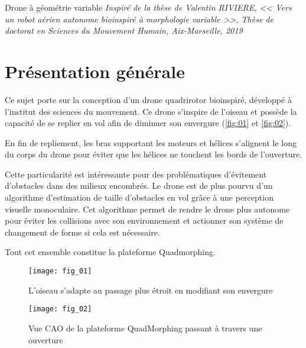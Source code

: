 
Drone à géométrie variable
\textit{Inspiré de la thèse de Valentin RIVIERE,
<< Vers un robot aérien autonome bio­inspiré à morphologie variable >>,
Thèse de doctorat en Sciences du Mouvement Humain, Aix-­Marseille, 2019}

\section*{Présentation générale}


Ce sujet porte sur la conception d’un drone quadrirotor bio­inspiré, développé à l’institut des
sciences du mouvement. Ce drone s’inspire de l’oiseau et possède la capacité de se replier
en vol afin de diminuer son envergure (\autoref{fig:01} et \autoref{fig:02}).

En fin de repliement, les bras supportant les moteurs et hélices s’alignent le long du corps
du drone pour éviter que les hélices ne touchent les bords de l’ouverture.

Cette particularité est intéressante pour des problématiques d’évitement d’obstacles dans
des milieux encombrés. Le drone est de plus pourvu d’un algorithme d’estimation de taille
d’obstacles en vol grâce à une perception visuelle monoculaire. Cet algorithme permet de
rendre le drone plus autonome pour éviter les collisions avec son environnement et actionner
son système de changement de forme si cela est nécessaire.

Tout cet ensemble constitue la plateforme Quadmorphing.


\begin{minipage}[c]{.48\linewidth}
\begin{figure}[H]
\centering
\texttt{[image: fig\_01]}
\caption{\label{fig:01} L’oiseau s’adapte au passage
plus étroit en modifiant son envergure}
\end{figure}
\end{minipage}\hfill
\begin{minipage}[c]{.48\linewidth}
\begin{figure}[H]
\centering
\texttt{[image: fig\_02]}
\caption{\label{fig:02} Vue CAO de la plateforme QuadMorphing passant à travers une ouverture}
\end{figure}
\end{minipage}

